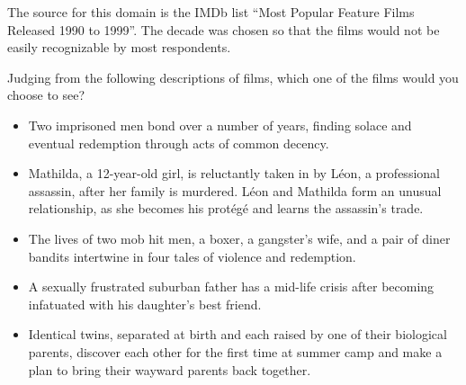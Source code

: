 The source for this domain is the IMDb list ``Most Popular Feature Films Released 1990 to
1999''.
The decade was chosen so that the films would not be easily recognizable by most respondents.

\begin{tcolorbox}
Judging from the following descriptions of films, which one of the films would you choose to see?

\begin{itemize}
	\item Two imprisoned men bond over a number of years, finding solace and
eventual redemption through acts of common decency.
	\item Mathilda, a 12-year-old girl, is reluctantly taken in by L\'eon, a
professional assassin, after her family is murdered. L\'eon and Mathilda
form an unusual relationship, as she becomes his prot\'eg\'e and learns the
assassin's trade.
	\item The lives of two mob hit men, a boxer, a gangster's wife, and a pair of diner bandits intertwine in four tales of violence and redemption.
	\item A sexually frustrated suburban father has a mid-life crisis after
becoming infatuated with his daughter's best friend.
	\item Identical twins, separated at birth and each raised by one of their
biological parents, discover each other for the first time at summer camp
and make a plan to bring their wayward parents back together.
\end{itemize}
\end{tcolorbox}
